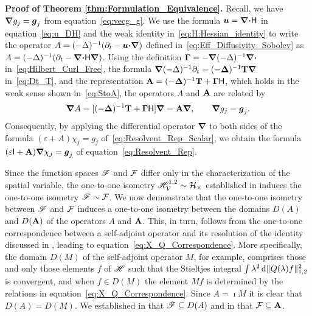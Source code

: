 \documentclass[amsa]{ipart}
\begin{document}
\textbf{Proof of Theorem \ref{thm:Formulation_Equivalence}.}\hspace{1ex}
%
Recall, we have $\mbox{\boldmath${\nabla}$}
g_j=\boldsymbol{g}_j$ from equation~\eqref{eq:vecg_g}.
We use the formula $\boldsymbol{u} =\mbox{\boldmath${\nabla}$} \mbox{\boldmath${\cdot}$}\mathsf{H}$ in equation~\eqref{eq:u_DH}
and the weak identity in~\eqref{eq:H:Hessian_identity} to write the
operator $A=(-\Delta)^{-1}(\partial_t-\boldsymbol{u}\mbox{\boldmath${\cdot}$}\mbox{\boldmath${\nabla}$})$ defined
in~\eqref{eq:Eff_Diffusivity_Sobolev} as 
$A=(-\Delta)^{-1}(\partial_t-\mbox{\boldmath${\nabla}$} \mbox{\boldmath${\cdot}$}\mathsf{H}\mbox{\boldmath${\nabla}$})$.   Using the 
definition $\mbox{\boldmath${\Gamma}$}=-\mbox{\boldmath${\nabla}$} (-\Delta)^{-1}\mbox{\boldmath${\nabla}$} \mbox{\boldmath${\cdot}$}$
in~\eqref{eq:Hilbert_Curl_Free}, the formula
$\mbox{\boldmath${\nabla}$}(-\Delta)^{-1}\partial_t=(-\mbox{\boldmath${\Delta}$})^{-1}\mathbf{T}\mbox{\boldmath${\nabla}$} \,$
in~\eqref{eq:Dt_T}, and the representation
$\mathbf{A}=(-\mbox{\boldmath${\Delta}$})^{-1}\mathbf{T}+\mbox{\boldmath${\Gamma}$}\mathsf{H}$, which holds in the weak sense
shown in~\eqref{eq:StoA}, the operators $A$ and $\mathbf{A}$ are related by
%
\begin{align}\label{eq:A_Ab_Relation}
  \bnabla A=[(-\bDelta)^{-1}\Tb+\bGamma\Hm]\bnabla =\Ab\bnabla , \qquad
  \bnabla g_j=\vecg_j.
\end{align}
%
Consequently, by applying the
differential operator $\mbox{\boldmath${\nabla}$} $ to both sides of the formula
$(\varepsilon+A)\chi_j=g_j$ of~\eqref{eq:Resolvent_Rep_Scalar}, we obtain the
formula  $(\varepsilon\mathsf{I}+\mathbf{A})\mbox{\boldmath${\nabla}$} \chi_j=\boldsymbol{g}_j$ of
equation~\eqref{eq:Resolvent_Rep}. 







Since the function spaces $\mathscr{F}$ and $\mathcal{F}$ differ only in the
characterization of the spatial variable, the one-to-one isometry
$\mathscr{H}^{1,2}_{\mathcal{V}}\sim\mathcal{H}_\times$ established in 
induces the one-to-one isometry $\mathscr{F}\sim\mathcal{F}$. We now 
demonstrate that the one-to-one isometry between $\mathscr{F}$ and $\mathcal{F}$
induces a one-to-one isometry between the domains $D(A)$ and $D(\mathbf{A})$
of the operators $A$ and $\mathbf{A}$. This, in turn, follows from the
one-to-one correspondence between a self-adjoint operator and its
resolution of the identity discussed in ,
leading to equation~\eqref{eq:X_Q_Correspondence}. More specifically,
the domain $D(M)$ of the self-adjoint operator $M$, for example,
comprises those and only those elements $f$ of $\mathscr{H}$ such that the
Stieltjes integral $\int\lambda^2\,\mathrm{d}\|Q(\lambda)f\|_{1,2}^2$ is convergent, and when
$f\in D(M)$ the element $Mf$ is determined by the relations in
equation~\eqref{eq:X_Q_Correspondence}. Since $A=\imath M$ it is clear that
$D(A)=D(M)$. We established in  that
$\mathscr{F}\subseteq D(A)$ and in  that $\mathcal{F}\subseteq\mathbf{A}$. 
\end{document}
